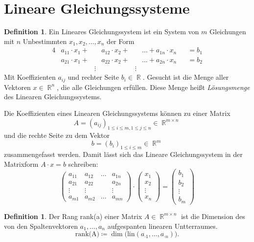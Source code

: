 \documentclass[a4paper,12pt]{article}
\DeclareMathOperator{\R}{\mathbb R}
\theoremstyle{definition}
\newtheorem{definition}[axiom]{Definition}
\begin{document}
	\setcounter{section}{9}
	\section{Lineare Gleichungssysteme}
	\begin{definition}
		Ein Lineares Gleichungssystem ist ein System von $m$ Gleichungen mit $n$ Unbestimmten $x_1, x_2, \ldots, x_n$ der Form
		\begin{alignat*}{4}
			&a_{11} \cdot x_1 + &&a_{12} \cdot x_2 + &&\ldots + a_{1n}\cdot x_n &&= b_1\\
			&a_{21} \cdot x_1 + &&a_{22} \cdot x_2 + &&\ldots + a_{2n}\cdot x_n &&= b_2\\
			&&\vdots&&\vdots
		\end{alignat*}
		Mit Koeffizienten $a_{ij}$ und rechter Seite $b_i \in \R$. Gesucht ist die Menge aller Vektoren $x \in \R^n$, die alle Gleichungen erfüllen. Diese Menge heißt {\itshape Lösungsmenge} des Linearen Gleichungssystems.
	\end{definition}
	Die Koeffizienten eines Linearen Gleichungssystems können zu einer Matrix
	\[
		A = (a_{ij})_{1\leq i\leq m, 1\leq j \leq n} \in \R^{m \times n}
	\]
	und die rechte Seite zu dem Vektor
	\[
		b = (b_i)_{1\leq i \leq m} \in \R^m
	\]
	zusammengefasst werden. Damit lässt sich das Lineare Gleichungssystem in der Matrixform $A\cdot x = b$ schreiben:
	\[
		\begin{pmatrix}
			a_{11} & a_{12} & \ldots & a_{1n}\\
			a_{21} & a_{22} & & a_{2n}\\
			\vdots & \vdots & & \vdots\\
			a_{m1} & a_{m2} & \ldots & a_{mn}
		\end{pmatrix}
		\cdot 
		\begin{pmatrix}
			x_1\\
			x_2\\
			\vdots\\
			x_n
		\end{pmatrix}
		= 
		\begin{pmatrix}
			b_1\\
			b_2\\
			\vdots\\
			b_m
		\end{pmatrix}
	\]
	\begin{definition}
		Der Rang {\ttfamily rank(a)} einer Matrix $A \in \R^{m \times n}$ ist die Dimension des von den Spaltenvektoren $a_1, \ldots, a_n$ aufgespanten linearen Untterraumes. 
		\[
			{\text{rank(A)}} \coloneq \dim \big(\text{lin}(a_{\cdot1}, \ldots, a_{\cdot n})\big).
		\]
	\end{definition}
\end{document}
